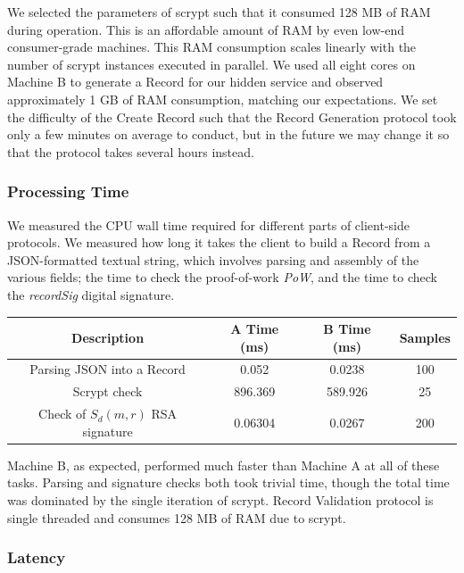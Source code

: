 We selected the parameters of scrypt such that it consumed 128 MB of RAM during operation. This is an affordable amount of RAM by even low-end consumer-grade machines. This RAM consumption scales linearly with the number of scrypt instances executed in parallel. We used all eight cores on Machine B to generate a Record for our hidden service and observed approximately 1 GB of RAM consumption, matching our expectations. We set the difficulty of the Create Record such that the Record Generation protocol took only a few minutes on average to conduct, but in the future we may change it so that the protocol takes several hours instead.

\subsubsection{Processing Time}

We measured the CPU wall time required for different parts of client-side protocols. We measured how long it takes the client to build a Record from a JSON-formatted textual string, which involves parsing and assembly of the various fields; the time to check the proof-of-work \emph{PoW}, and the time to check the \emph{recordSig} digital signature.

\renewcommand{\arraystretch}{1}
\begin{center}
    \begin{tabular}{ | c | c | c | c |}
    \hline
    \textbf{Description} & \textbf{A Time (ms)} & \textbf{B Time (ms)} & \textbf{Samples} \\
    \hline
    Parsing JSON into a Record & 0.052 & 0.0238 & 100 \\ \hline
	Scrypt check & 896.369 & 589.926 & 25 \\ \hline
	Check of $ S_{d}(m, r) $ RSA signature & 0.06304 & 0.0267 & 200 \\
	\hline
    \end{tabular}
\end{center}

Machine B, as expected, performed much faster than Machine A at all of these tasks. Parsing and signature checks both took trivial time, though the total time was dominated by the single iteration of scrypt. Record Validation protocol is single threaded and consumes 128 MB of RAM due to scrypt.

\subsubsection{Latency}

